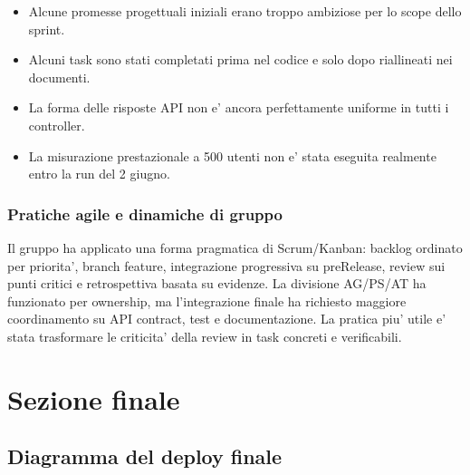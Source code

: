 \documentclass[11pt,a4paper]{article}
\begin{document}
\begin{itemize}
  \item Alcune promesse progettuali iniziali erano troppo ambiziose per lo scope dello sprint.
  \item Alcuni task sono stati completati prima nel codice e solo dopo riallineati nei documenti.
  \item La forma delle risposte API non e' ancora perfettamente uniforme in tutti i controller.
  \item La misurazione prestazionale a 500 utenti non e' stata eseguita realmente entro la run del 2 giugno.
\end{itemize}

\subsubsection{Pratiche agile e dinamiche di gruppo}

Il gruppo ha applicato una forma pragmatica di Scrum/Kanban: backlog ordinato per priorita',
branch feature, integrazione progressiva su preRelease, review sui punti critici e retrospettiva
basata su evidenze. La divisione AG/PS/AT ha funzionato per ownership, ma l'integrazione finale
ha richiesto maggiore coordinamento su API contract, test e documentazione. La pratica piu'
utile e' stata trasformare le criticita' della review in task concreti e verificabili.

\section{Sezione finale}

\subsection{Diagramma del deploy finale}
\end{document}
